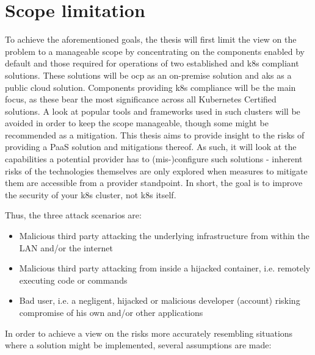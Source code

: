 \section{Scope limitation}

To achieve the aforementioned goals, the thesis will first limit the view on the problem to a manageable scope by
concentrating on the components enabled by default and those required for operations of two established and \gls{k8s} compliant solutions.
These solutions will be \gls{ocp} as an on-premise solution and \gls{aks} as a public cloud solution.
Components providing \gls{k8s} compliance will be the main focus, as these bear the most significance across all Kubernetes Certified solutions. 
A look at popular tools and frameworks used in such clusters will be avoided in order to keep the scope manageable, though some might be recommended as a mitigation.
This thesis aims to provide insight to the risks of providing a PaaS solution and mitigations thereof. 
As such, it will look at the capabilities a potential provider has to (mis-)configure such solutions - inherent risks of the technologies themselves are only explored when measures to mitigate them are accessible from a provider standpoint. 
In short, the goal is to improve the security of your \gls{k8s} cluster, not \gls{k8s} itself.


Thus, the three attack scenarios are:

\begin{itemize}

\item Malicious third party attacking the underlying infrastructure from within the LAN and/or the internet

\item Malicious third party attacking from inside a hijacked container, i.e. remotely executing code or commands

\item Bad user, i.e. a negligent, hijacked or malicious developer (account) risking compromise of his own and/or other applications

\end{itemize}

In order to achieve a view on the risks more accurately resembling situations where a solution might be implemented, several assumptions are made:

